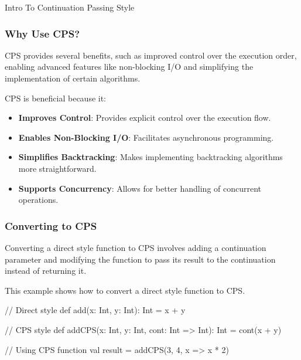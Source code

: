\begin{notes}{Intro To Continuation Passing Style}
    \subsubsection*{Why Use CPS?}
    
    CPS provides several benefits, such as improved control over the execution order, enabling advanced features like non-blocking I/O and simplifying the implementation of certain algorithms.
    
    \begin{highlight}
    
        CPS is beneficial because it:
    
        \begin{itemize}
            \item \textbf{Improves Control}: Provides explicit control over the execution flow.
            \item \textbf{Enables Non-Blocking I/O}: Facilitates asynchronous programming.
            \item \textbf{Simplifies Backtracking}: Makes implementing backtracking algorithms more straightforward.
            \item \textbf{Supports Concurrency}: Allows for better handling of concurrent operations.
        \end{itemize}
    
    \end{highlight}
    
    \subsubsection*{Converting to CPS}
    
    Converting a direct style function to CPS involves adding a continuation parameter and modifying the function to pass its result to the continuation instead of returning it.
    
    \begin{highlight}
    
        This example shows how to convert a direct style function to CPS.
    
    \begin{code}[Scala]
    // Direct style
    def add(x: Int, y: Int): Int = x + y
    
    // CPS style
    def addCPS(x: Int, y: Int, cont: Int => Int): Int = cont(x + y)
    
    // Using CPS function
    val result = addCPS(3, 4, x => x * 2)
    \end{code}
    

\end{highlight}
\end{notes}
